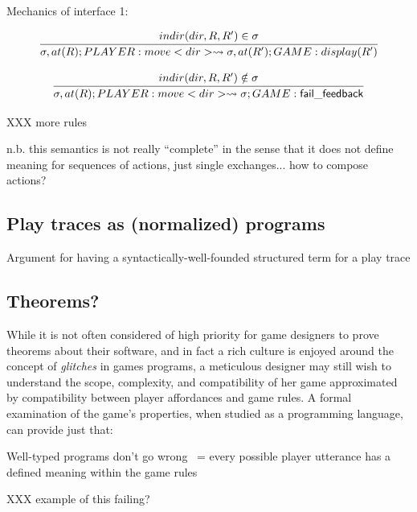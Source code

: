   Mechanics of interface 1:

  \[
    \infer{
      \sigma, at(R); PLAYER: move<dir> \stepsto \sigma, at(R'); GAME:
      display(R')
    }
    {
      indir(dir, R, R') \in \sigma
    }
  \]


  \[
    \infer{
      \sigma, at(R); PLAYER: move<dir> \stepsto 
      \sigma; GAME: \mathsf{fail\_feedback}
    }
    {
      indir(dir, R, R') \notin \sigma
    }
  \]

  XXX more rules

  n.b. this semantics is not really ``complete'' in the sense that it does
  not define meaning for sequences of actions, just single exchanges... how
  to compose actions?

  \subsection{Play traces as (normalized) programs}
  
  Argument for having a syntactically-well-founded structured term for a
  play trace

  \subsection{Theorems?}

  While it is not often considered of high priority for game designers to
  prove theorems about their software, and in fact a rich culture is
  enjoyed around the concept of {\em glitches} in games programs, a
  meticulous designer may still wish to understand the scope, complexity,
  and compatibility of her game approximated by compatibility between 
  player affordances and game rules. A formal examination of the game's
  properties, when studied as a programming language, can provide just
  that:

  Well-typed programs don't go wrong ~= every possible player utterance has
  a defined meaning within the game rules

  XXX example of this failing?

